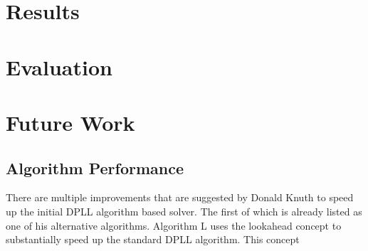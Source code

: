 \documentclass{article}
\begin{document}

\section{Results}

\section{Evaluation}

\section{Future Work}

\subsection{Algorithm Performance}
There are multiple improvements that are suggested by Donald Knuth to speed up the initial DPLL algorithm based solver. The first of which is already listed as one of his alternative algorithms. Algorithm L uses the lookahead concept to substantially speed up the standard DPLL algorithm. This concept %
\end{document}
